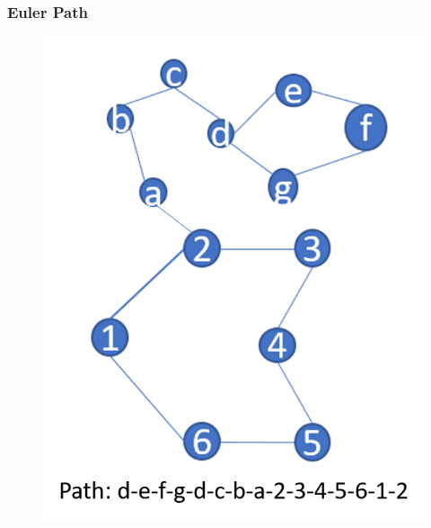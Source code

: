 \documentclass{beamer}
\begin{document}
\begin{frame}
\frametitle{Euler Path}
\begin{figure}[h]
\includegraphics[scale = 0.3]{path.png}
\end{figure}
\end{frame}

\end{document}
